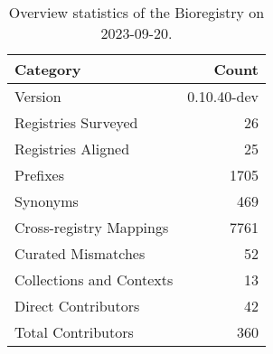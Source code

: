\begin{table}
\caption{Overview statistics of the Bioregistry on 2023-09-20.}
\label{tab:bioregistry-summary}
\begin{tabular}{lr}
\toprule
Category & Count \\
\midrule
Version & 0.10.40-dev \\
Registries Surveyed & 26 \\
Registries Aligned & 25 \\
Prefixes & 1705 \\
Synonyms & 469 \\
Cross-registry Mappings & 7761 \\
Curated Mismatches & 52 \\
Collections and Contexts & 13 \\
Direct Contributors & 42 \\
Total Contributors & 360 \\
\bottomrule
\end{tabular}
\end{table}
